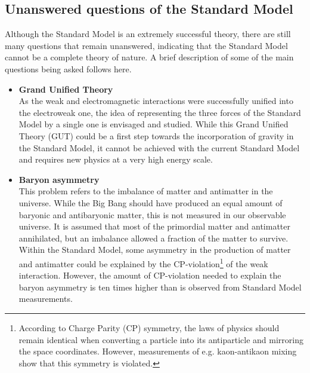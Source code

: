 \subsection{Unanswered questions of the Standard Model}

Although the Standard Model is an extremely successful theory, there are still many questions that remain unanswered, indicating that the Standard Model cannot be a complete theory of nature. A brief description of some of the main questions being asked follows here.
\begin{itemize}
 \item[] \textbf{Grand Unified Theory}\\
 As the weak and electromagnetic interactions were successfully unified into the electroweak one, the idea of representing the three forces of the Standard Model by a single one is envisaged and studied. While this Grand Unified Theory (GUT) could be a first step towards the incorporation of gravity in the Standard Model, it cannot be achieved with the current Standard Model and requires new physics at a very high energy scale.
 
 \item[]\textbf{Baryon asymmetry}\\ 
 This problem refers to the imbalance of matter and antimatter in the universe. While the Big Bang should have produced an equal amount of baryonic and antibaryonic matter, this is not measured in our observable universe. It is assumed that most of the primordial matter and antimatter annihilated, but an imbalance allowed a fraction of the matter to survive. Within the Standard Model, some asymmetry in the production of matter and antimatter could be explained by the CP-violation\footnote{According to Charge Parity (CP) symmetry, the laws of physics should remain identical when converting a particle into its antiparticle and mirroring the space coordinates. However, measurements of e.g. kaon-antikaon mixing show that this symmetry is violated.} of the weak interaction. However, the amount of CP-violation needed to explain the baryon asymmetry is ten times higher than is observed from Standard Model measurements. 
 

\end{itemize}
